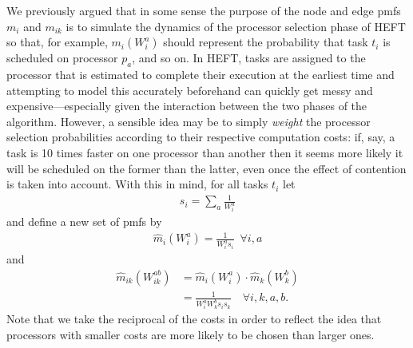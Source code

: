 \documentclass[12pt]{article}
\begin{document}
We previously argued that in some sense the purpose of the node and edge pmfs $m_i$ and $m_{ik}$ is to simulate the dynamics of the processor selection phase of HEFT so that, for example, $m_i(W_i^a)$ should represent the probability that task $t_i$ is scheduled on processor $p_a$, and so on. In HEFT, tasks are assigned to the processor that is estimated to complete their execution at the earliest time and attempting to model this accurately beforehand can quickly get messy and expensive---especially given the interaction between the two phases of the algorithm. However, a sensible idea may be to simply {\em weight} the processor selection probabilities according to their respective computation costs: if, say, a task is 10 times faster on one processor than another then it seems more likely it will be scheduled on the former than the latter, even once the effect of contention is taken into account. With this in mind, for all tasks $t_i$ let 
\begin{align*}
s_i = \sum_{a} \frac{1}{W_i^a}
\end{align*} 
and define a new set of pmfs by
\begin{align*}
\hat{m}_i(W_i^a) = \frac{1}{W_i^as_i} \enspace \forall i, a
\end{align*}
and 
\begin{align*}
\hat{m}_{ik}(W_{ik}^{ab}) &= \hat{m}_i(W_i^a) \cdot \hat{m}_k(W_k^b) \\
&= \frac{1}{W_i^aW_k^bs_is_k} \quad \forall i, k, a, b.
\end{align*}
Note that we take the reciprocal of the costs in order to reflect the idea that processors with smaller costs are more likely to be chosen than larger ones.
\end{document}
